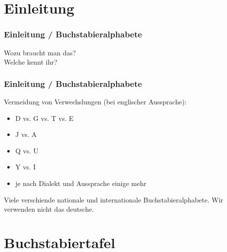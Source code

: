 

\subtitle{Betriebstechnik/Vorschriften 02:         \\
  Das ``Internationale Buchstabieralphabet'' \\[2em]}
\date{Stand 10.10.2016}


\section*{Einleitung}

\begin{frame}
  \frametitle{Einleitung / Buchstabieralphabete}
  \begin{center}
    \Large{Wozu braucht man das?} \\
    \Large{Welche kennt ihr?}
  \end{center}
\end{frame}

\begin{frame}
  \frametitle{Einleitung / Buchstabieralphabete}

  Vermeidung von Verwechslungen (bei englischer Aussprache):

  \begin{itemize}
    \item D vs. G vs. T vs. E
    \item J vs. A
    \item Q vs. U
    \item Y vs. I
    \item je nach Dialekt und Aussprache einige mehr
  \end{itemize}

  Viele verschiende nationale und internationale Buchstabieralphabete. Wir
  verwenden nicht das deutsche.

\end{frame}

\section*{Buch\-stabier\-tafel}

